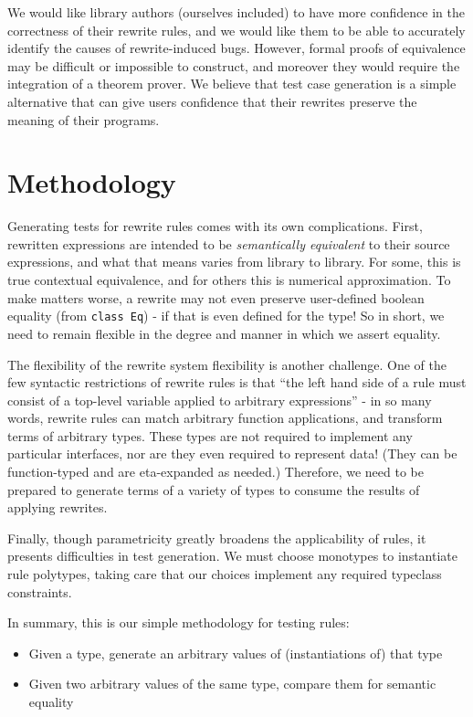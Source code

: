 \documentclass[format=sigconf, nonacm=true, review=true, screen=true]{acmart}
\begin{document}
We would like library authors (ourselves included) to have more confidence in the correctness of their rewrite rules, and we would like them to be able to accurately identify the causes of rewrite-induced bugs. However, formal proofs of equivalence may be difficult or impossible to construct, and moreover they would require the integration of a theorem prover. We believe that test case generation is a simple alternative that can give users confidence that their rewrites preserve the meaning of their programs.

\section{Methodology}

Generating tests for rewrite rules comes with its own complications. First, rewritten expressions are intended to be \textit{semantically equivalent} to their source expressions, and what that means varies from library to library. For some, this is true contextual equivalence, and for others this is numerical approximation. To make matters worse, a rewrite may not even preserve user-defined boolean equality (from \texttt{class Eq}) - if that is even defined for the type! So in short, we need to remain flexible in the degree and manner in which we assert equality.

The flexibility of the rewrite system flexibility is another challenge. One of the few syntactic restrictions of rewrite rules is that ``the left hand side of a rule must consist of a top-level variable applied to arbitrary expressions'' \cite{userguide} - in so many words, rewrite rules can match arbitrary function applications, and transform terms of arbitrary types. These types are not required to implement any particular interfaces, nor are they even required to represent data! (They can be function-typed and are eta-expanded as needed.) Therefore, we need to be prepared to generate terms of a variety of types to consume the results of applying rewrites.

Finally, though parametricity greatly broadens the applicability of rules, it presents difficulties in test generation. We must choose monotypes to instantiate rule polytypes, taking care that our choices implement any required typeclass constraints.

In summary, this is our simple methodology for testing rules:

\begin{itemize}
  \item Given a type, generate an arbitrary values of (instantiations of) that type
  \item Given two arbitrary values of the same type, compare them for semantic equality
\end{itemize}
\end{document}
